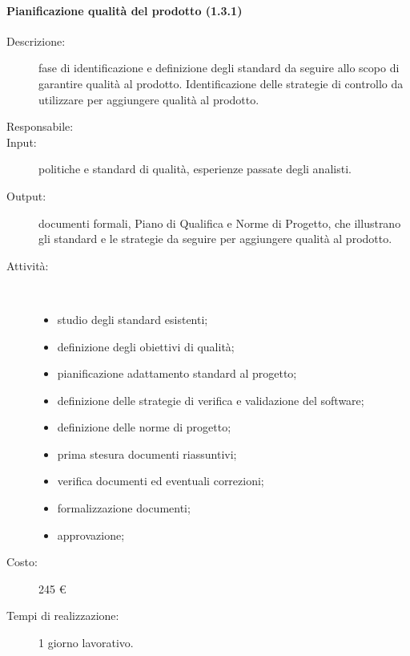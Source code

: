\paragraph{Pianificazione qualit\`{a} del prodotto (1.3.1)}
\begin{description}
\item[Descrizione:] fase di identificazione e definizione degli standard da seguire allo scopo di garantire qualit\`{a} al prodotto. Identificazione delle strategie di controllo da utilizzare per aggiungere qualit\`{a} al prodotto.
\item[Responsabile:] 
\item[Input:] politiche e standard di qualità, esperienze passate degli analisti.
\item[Output:] documenti formali, Piano di Qualifica e Norme di Progetto, che illustrano gli standard e le strategie da seguire per aggiungere qualità al prodotto.
\item[Attività:]\mbox{}\\[-1.5\baselineskip]
	\begin{itemize}
	\item studio degli standard esistenti;
	\item definizione degli obiettivi di qualità;
	\item pianificazione adattamento standard al progetto;
	\item definizione delle strategie di verifica e validazione del software;
	\item definizione delle norme di progetto;
	\item prima stesura documenti riassuntivi;
	\item verifica documenti ed eventuali correzioni;
	\item formalizzazione documenti;
	\item approvazione;
	\end{itemize}
\item[Costo:] 245 \euro{}
\item[Tempi di realizzazione:] 1 giorno lavorativo.
\end{description}

